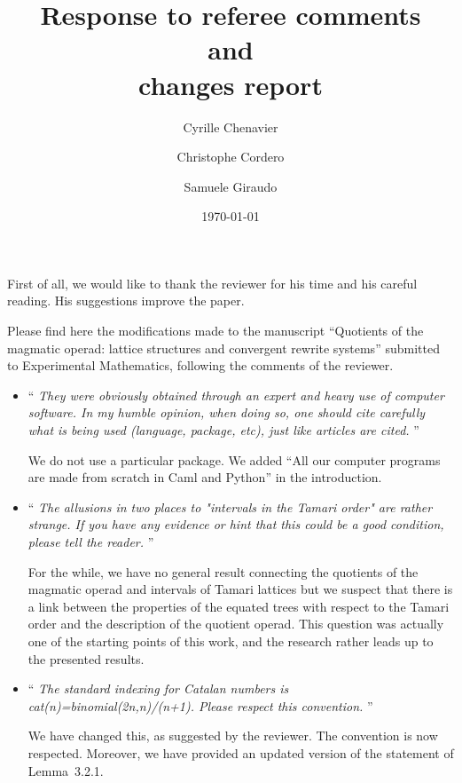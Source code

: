 \documentclass[11pt,reqno]{amsart}
\title[Response to Referees]
    {Response to referee comments \\
    and \\
    changes report}
\date{\today}
\author{Cyrille Chenavier \and Christophe Cordero \and Samuele Giraudo}
\numberwithin{equation}{subsection}
\begin{document}
\maketitle

First of all, we would like to thank the reviewer for his time and his
careful reading. His suggestions improve the paper.
\medbreak

Please find here the modifications made to the manuscript
``Quotients of the magmatic operad: lattice structures and convergent
rewrite systems'' submitted to Experimental Mathematics, following
the comments of the reviewer.
\bigbreak

\begin{itemize}

\item `` {\it
They were obviously obtained through an expert and
heavy use of computer software.
In my humble opinion, when doing so, one should cite carefully what
is being used (language, package, etc), just like articles are cited.
}''
\smallbreak

We do not use a particular package. We added
``All our computer programs are made from scratch in {\sc Caml}
and {\sc Python}'' in the introduction.
\medbreak

\item `` {\it
The allusions in two places to "intervals in the Tamari order" are
rather strange. If you have any evidence or hint that this could be a
good condition, please tell the reader.
}''
\smallbreak

For the while, we have no general result connecting the quotients of
the magmatic operad and intervals of Tamari lattices but we suspect
that there is a link between the properties of the equated trees
with respect to the Tamari order and the description of the quotient
operad. This question was actually one of the starting points of this
work, and the research rather leads up to the presented results.
\medbreak

\item `` {\it
The standard indexing for Catalan numbers is
cat(n)=binomial(2n,n)/(n+1). Please respect this convention.
}''
\smallbreak

We have changed this, as suggested by the reviewer. The convention is
now respected. Moreover, we have provided an updated version of
the statement of Lemma~3.2.1.
\medbreak


\end{itemize}
\end{document}
